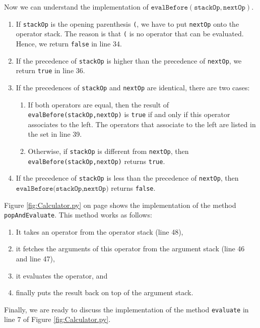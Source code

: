 Now we can understand the implementation of $\texttt{evalBefore}(\texttt{stackOp},\texttt{nextOp})$.
\begin{enumerate}
\item If \texttt{stackOp} is the opening parenthesis \texttt{(}, we have to put
      \texttt{nextOp} onto the operator stack.  The reason is that \texttt{(}
      is no operator that can be evaluated.  Hence, we return \texttt{false} in line 34.
\item If the precedence of \texttt{stackOp} is higher than the precedence of \texttt{nextOp}, we
      return \texttt{true} in line 36.
\item If the precedences of \texttt{stackOp} and \texttt{nextOp} are identical, there are two cases:
      \begin{enumerate}
      \item If both operators are equal, then the result of
            \texttt{evalBefore(stackOp,nextOp)} is \texttt{true} if and only if
            this operator associates to the left.  The operators that associate to the left are
            listed in the set in line 39.
      \item Otherwise, if \texttt{stackOp} is different from \texttt{nextOp}, then \\
            \texttt{evalBefore(stackOp,nextOp)} returns \texttt{true}. 
      \end{enumerate}
\item If the precedence of \texttt{stackOp} is less than the precedence of \texttt{nextOp}, then 
      $\texttt{evalBefore(stackOp,nextOp})$ returns \texttt{false}.
\end{enumerate}
Figure  \ref{fig:Calculator.py} on page \pageref{fig:Calculator.py} shows the
implementation of the method \texttt{popAndEvaluate}.
This method works as follows: 
\begin{enumerate}
\item It takes an operator from the operator stack (line 48), 
\item it fetches the arguments of this operator from the argument stack (line 46 and line 47),
\item it evaluates the operator,  and
\item finally puts the result back on top of the argument stack.
\end{enumerate}
Finally, we are ready to discuss the implementation of the method \texttt{evaluate} in line 7 of
Figure \ref{fig:Calculator.py}.  


